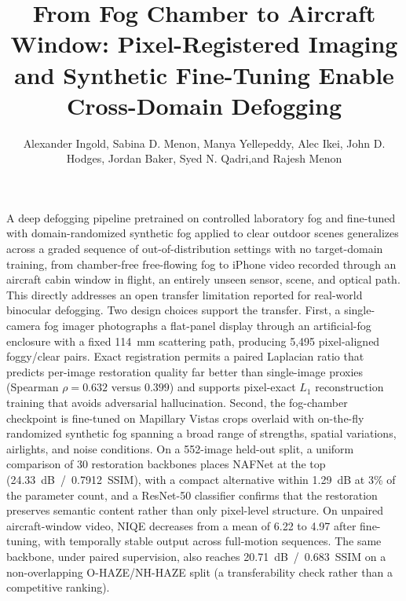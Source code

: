 \documentclass{optica-article}
\begin{document}
\title{From Fog Chamber to Aircraft Window: Pixel-Registered Imaging and Synthetic Fine-Tuning Enable Cross-Domain Defogging}

\author{Alexander Ingold, Sabina D. Menon, Manya Yellepeddy, Alec Ikei, John D. Hodges, Jordan Baker, Syed N. Qadri,and Rajesh Menon}

\address{ Department of Electrical and Computer Engineering, University of Utah, Salt Lake City, UT 84112, USA\\
 U.S. Naval Research Laboratory Remote Sensing Division, Washington DC 20375, USA.\\}



\begin{abstract*}
A deep defogging pipeline pretrained on controlled laboratory fog
and fine-tuned with domain-randomized synthetic fog applied to
clear outdoor scenes generalizes across a graded sequence of
out-of-distribution settings with no target-domain training, from
chamber-free free-flowing fog to iPhone video recorded through an
aircraft cabin window in flight, an entirely unseen sensor, scene,
and optical path. This directly addresses an open transfer
limitation reported for real-world binocular defogging. Two design
choices support the transfer. First, a single-camera fog imager
photographs a flat-panel display through an artificial-fog
enclosure with a fixed 114~mm scattering path, producing 5{,}495
pixel-aligned foggy/clear pairs. Exact registration permits a
paired Laplacian ratio that predicts per-image restoration quality
far better than single-image proxies (Spearman $\rho = 0.632$
versus $0.399$) and supports pixel-exact $L_1$ reconstruction
training that avoids adversarial hallucination. Second, the
fog-chamber checkpoint is fine-tuned on Mapillary Vistas crops
overlaid with on-the-fly randomized synthetic fog spanning a broad
range of strengths, spatial variations, airlights, and noise
conditions. On a 552-image held-out split, a uniform comparison of
30 restoration backbones places NAFNet at the top
(24.33~dB~/~0.7912~SSIM), with a compact alternative within
1.29~dB at 3\% of the parameter count, and a ResNet-50 classifier
confirms that the restoration preserves semantic content rather
than only pixel-level structure. On unpaired aircraft-window
video, NIQE decreases from a mean of 6.22 to 4.97 after
fine-tuning, with temporally stable output across full-motion
sequences. The same backbone, under
paired supervision, also reaches 20.71~dB~/~0.683~SSIM on a
non-overlapping O-HAZE/NH-HAZE split (a transferability check
rather than a competitive ranking).
\end{abstract*}
\end{document}
